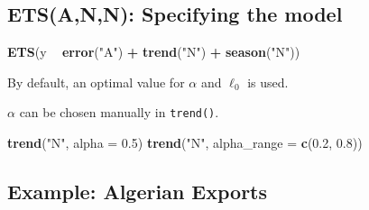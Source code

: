 \documentclass[]{book}
\newenvironment{Shaded}{\begin{snugshade}}{\end{snugshade}}
\newcommand{\DataTypeTok}[1]{\textcolor[rgb]{0.13,0.29,0.53}{#1}}
\newcommand{\FloatTok}[1]{\textcolor[rgb]{0.00,0.00,0.81}{#1}}
\newcommand{\KeywordTok}[1]{\textcolor[rgb]{0.13,0.29,0.53}{\textbf{#1}}}
\newcommand{\NormalTok}[1]{#1}
\newcommand{\OperatorTok}[1]{\textcolor[rgb]{0.81,0.36,0.00}{\textbf{#1}}}
\newcommand{\StringTok}[1]{\textcolor[rgb]{0.31,0.60,0.02}{#1}}
\begin{document}
\hypertarget{etsann-specifying-the-model}{%
\subsection{ETS(A,N,N): Specifying the model}\label{etsann-specifying-the-model}}

\begin{Shaded}
\begin{Highlighting}[]
\KeywordTok{ETS}\NormalTok{(y }\OperatorTok{~}\StringTok{ }\KeywordTok{error}\NormalTok{(}\StringTok{"A"}\NormalTok{) }\OperatorTok{+}\StringTok{ }\KeywordTok{trend}\NormalTok{(}\StringTok{"N"}\NormalTok{) }\OperatorTok{+}\StringTok{ }\KeywordTok{season}\NormalTok{(}\StringTok{"N"}\NormalTok{))}
\end{Highlighting}
\end{Shaded}

By default, an optimal value for \(\alpha\) and \(\ell_0\) is used.

\(\alpha\) can be chosen manually in \texttt{trend()}.

\begin{Shaded}
\begin{Highlighting}[]
\KeywordTok{trend}\NormalTok{(}\StringTok{"N"}\NormalTok{, }\DataTypeTok{alpha =} \FloatTok{0.5}\NormalTok{)}
\KeywordTok{trend}\NormalTok{(}\StringTok{"N"}\NormalTok{, }\DataTypeTok{alpha_range =} \KeywordTok{c}\NormalTok{(}\FloatTok{0.2}\NormalTok{, }\FloatTok{0.8}\NormalTok{))}
\end{Highlighting}
\end{Shaded}

\hypertarget{example-algerian-exports}{%
\subsection{Example: Algerian Exports}\label{example-algerian-exports}}

\begin{Shaded}
\end{Shaded}
\end{document}
